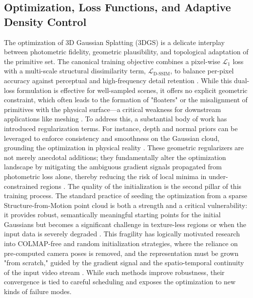 \documentclass[11pt,a4paper]{article}
\begin{document}
\subsection{Optimization, Loss Functions, and Adaptive Density Control}


The optimization of 3D Gaussian Splatting (3DGS) is a delicate interplay between photometric fidelity, geometric plausibility, and topological adaptation of the primitive set. The canonical training objective combines a pixel-wise \(\mathcal{L}_1\) loss with a multi-scale structural dissimilarity term, \(\mathcal{L}_{\text{D-SSIM}}\), to balance per-pixel accuracy against perceptual and high-frequency detail retention \cite{arxiv:2308.04079v1}. While this dual-loss formulation is effective for well-sampled scenes, it offers no explicit geometric constraint, which often leads to the formation of "floaters" or the misalignment of primitives with the physical surface---a critical weakness for downstream applications like meshing \cite{arxiv:2403.17888v1,arxiv:2403.17822v1}. To address this, a substantial body of work has introduced regularization terms. For instance, depth and normal priors can be leveraged to enforce consistency and smoothness on the Gaussian cloud, grounding the optimization in physical reality \cite{arxiv:2403.17822v1,arxiv:2403.06912v3,arxiv:2406.06521v1}. These geometric regularizers are not merely anecdotal additions; they fundamentally alter the optimization landscape by mitigating the ambiguous gradient signals propagated from photometric loss alone, thereby reducing the risk of local minima in under-constrained regions \cite{arxiv:2404.00409v1,arxiv:2406.01467v2}. The quality of the initialization is the second pillar of this training process. The standard practice of seeding the optimization from a sparse Structure-from-Motion point cloud is both a strength and a critical vulnerability: it provides robust, semantically meaningful starting points for the initial Gaussians but becomes a significant challenge in texture-less regions or when the input data is severely degraded \cite{arxiv:2402.14650v1,arxiv:2312.07504v1}. This fragility has logically motivated research into COLMAP-free and random initialization strategies, where the reliance on pre-computed camera poses is removed, and the representation must be grown "from scratch," guided by the gradient signal and the spatio-temporal continuity of the input video stream \cite{arxiv:2312.07504v1}. While such methods improve robustness, their convergence is tied to careful scheduling and exposes the optimization to new kinds of failure modes.
\end{document}
